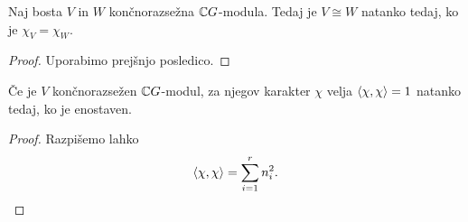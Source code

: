 \begin{posledica}
Naj bosta $V$ in $W$ končnorazsežna $\mathbb{C} G$-modula. Tedaj je
$V \cong W$ natanko tedaj, ko je $\chi_V = \chi_W$.
\end{posledica}

\begin{proof}
Uporabimo prejšnjo posledico.
\end{proof}

\begin{posledica}
Če je $V$ končnorazsežen $\mathbb{C} G$-modul, za njegov karakter $\chi$
velja $\left\langle \chi, \chi\right\rangle = 1$ natanko tedaj, ko je enostaven.
\end{posledica}

\begin{proof}
Razpišemo lahko
\[
\left\langle \chi, \chi\right\rangle = \sum_{i=1}^r n_i^2. \qedhere
\]
\end{proof}
